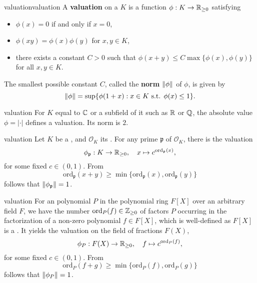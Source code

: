 \begin{topic}{valuation}{valuation}
    A \textbf{valuation} on a  $K$ is a function $\phi : K \to \mathbb{R}_{\ge 0}$ satisfying
    \begin{itemize}
        \item $\phi(x) = 0$ if and only if $x = 0$,
        \item $\phi(xy) = \phi(x) \phi(y)$ for $x, y \in K$,
        \item there exists a constant $C > 0$ such that $\phi(x + y) \le C \max \{ \phi(x), \phi(y) \}$ for all $x, y \in K$.
    \end{itemize}
    The smallest possible constant $C$, called the \textbf{norm} $\left\|\phi\right\|$ of $\phi$, is given by
    \[ \left\|\phi\right\| = \sup \{ \phi(1 + x) : x \in K \textup{ s.t. } \phi(x) \le 1 \} . \]
\end{topic}

\begin{example}{valuation}
    For $K$ equal to $\mathbb{C}$ or a subfield of it such as $\mathbb{R}$ or $\mathbb{Q}$, the absolute value $\phi = |\cdot|$ defines a valuation. Its norm is $2$.
\end{example}

\begin{example}{valuation}
    Let $K$ be a , and $\mathcal{O}_K$ its . For any prime $\mathfrak{p}$ of $\mathcal{O}_K$, there is the valuation
    \[ \phi_\mathfrak{p} : K \to \mathbb{R}_{\ge 0}, \quad x \mapsto c^{\text{ord}_\mathfrak{p}(x)} , \]
    for some fixed $c \in (0, 1)$. From
    \[ \text{ord}_\mathfrak{p}(x + y) \ge \min \{ \text{ord}_\mathfrak{p}(x), \text{ord}_\mathfrak{p}(y) \} \]
    follows that $\left\|\phi_\mathfrak{p}\right\| = 1$.
\end{example}

\begin{example}{valuation}
    For an  polynomial $P$ in the polynomial ring $F[X]$ over an arbitrary field $F$, we have the number $\text{ord}_P(f) \in \mathbb{Z}_{\ge 0}$ of factors $P$ occurring in the factorization of a non-zero polynomial $f \in F[X]$, which is well-defined as $F[X]$ is a . It yields the valuation on the field of fractions $F(X)$,
    \[ \phi_P : F(X) \to \mathbb{R}_{\ge 0}, \quad f \mapsto c^{\text{ord}_P(f)} ,  \]
    for some fixed $c \in (0, 1)$. From
    \[ \text{ord}_P(f + g) \ge \min \{ \text{ord}_P(f), \text{ord}_P(g) \} \]
    follows that $\left\|\phi_P\right\| = 1$.
\end{example}

